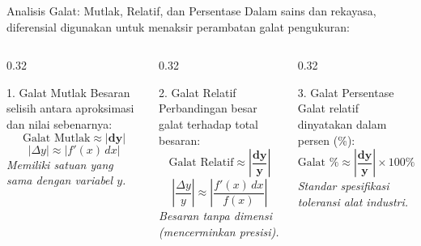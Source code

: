 \documentclass[aspectratio=169,10pt]{beamer}
\begin{document}
\begin{frame}{Analisis Galat: Mutlak, Relatif, dan Persentase}
    Dalam sains dan rekayasa, diferensial digunakan untuk menaksir perambatan galat pengukuran:

    \vspace{0.15cm}
    \begin{columns}[T]
        \begin{column}{0.32\textwidth}
            \begin{block}{1. Galat Mutlak}
                Besaran selisih antara aproksimasi dan nilai sebenarnya:
                \[
                    \text{Galat Mutlak} \approx |\mathbf{dy}|
                \]
                \[
                    |\Delta y| \approx |f'(x)\,dx|
                \]
                {\scriptsize \textit{Memiliki satuan yang sama dengan variabel $y$.}}
            \end{block}
        \end{column}

        \begin{column}{0.32\textwidth}
            \begin{block}{2. Galat Relatif}
                Perbandingan besar galat terhadap total besaran:
                \[
                    \text{Galat Relatif} \approx \left| \frac{\mathbf{dy}}{\mathbf{y}} \right|
                \]
                \[
                    \left| \frac{\Delta y}{y} \right| \approx \left| \frac{f'(x)\,dx}{f(x)} \right|
                \]
                {\scriptsize \textit{Besaran tanpa dimensi (mencerminkan presisi).}}
            \end{block}
        \end{column}

        \begin{column}{0.32\textwidth}
            \begin{block}{3. Galat Persentase}
                Galat relatif dinyatakan dalam persen (\%):
                \[
                    \text{Galat } \% \approx \left| \frac{\mathbf{dy}}{\mathbf{y}} \right| \times 100\%
                \]
                \vspace{0.15cm}
                {\scriptsize \textit{Standar spesifikasi toleransi alat industri.}}
            \end{block}
        \end{column}
    \end{columns}
\end{frame}
\end{document}
